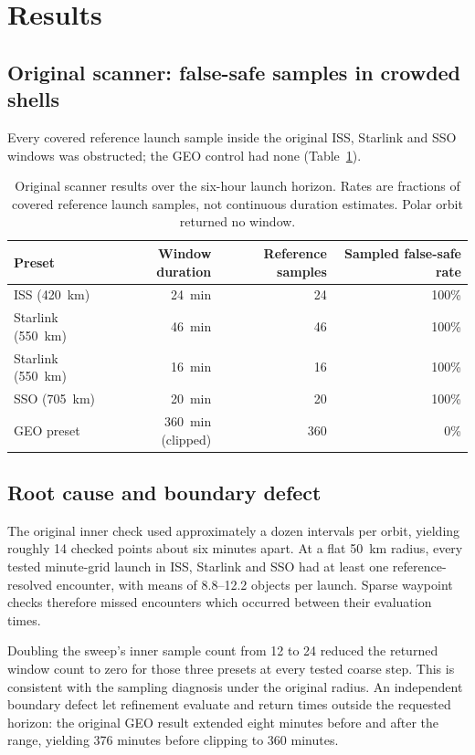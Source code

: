\documentclass[11pt,a4paper]{article}
\begin{document}
\section{Results}
\label{sec:results}

\subsection{Original scanner: false-safe samples in crowded shells}

Every covered reference launch sample inside the original ISS, Starlink
and SSO windows was obstructed; the GEO control had none
(Table~\ref{tab:baseline}).

\begin{table}[htbp]
\centering
\small
\begin{tabular}{lrrr}
\toprule
Preset & Window duration & Reference samples & Sampled false-safe rate \\
\midrule
ISS (420~km)      & 24~min & 24 & 100\% \\
Starlink (550~km) & 46~min & 46 & 100\% \\
Starlink (550~km) & 16~min & 16 & 100\% \\
SSO (705~km)      & 20~min & 20 & 100\% \\
GEO preset       & 360~min (clipped) & 360 & 0\% \\
\bottomrule
\end{tabular}
\caption{Original scanner results over the six-hour launch horizon.
Rates are fractions of covered reference launch samples, not continuous
duration estimates. Polar orbit returned no window.}
\label{tab:baseline}
\end{table}

\subsection{Root cause and boundary defect}

The original inner check used approximately a dozen intervals per orbit,
yielding roughly 14 checked points about six minutes apart. At a flat
50~km radius, every tested minute-grid launch in ISS, Starlink and SSO
had at least one reference-resolved encounter, with means of 8.8--12.2
objects per launch. Sparse waypoint checks therefore missed encounters
which occurred between their evaluation times.

Doubling the sweep's inner sample count from 12 to 24 reduced the returned
window count to zero for those three presets at every tested coarse step.
This is consistent with the sampling diagnosis under the original
radius. An independent boundary defect let refinement evaluate and return
times outside the requested horizon: the original GEO result extended
eight minutes before and after the range, yielding 376 minutes before
clipping to 360 minutes.
\end{document}
